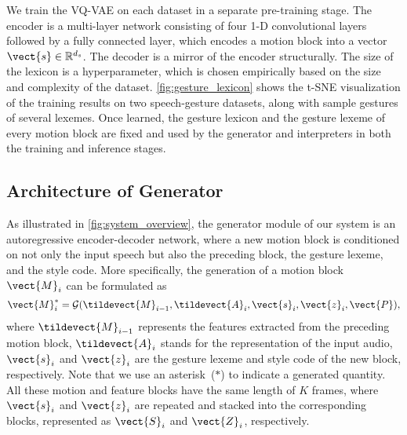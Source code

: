 We train the VQ-VAE on each dataset in a separate pre-training stage. The encoder is a multi-layer network consisting of four 1-D convolutional layers followed by a fully connected layer, which encodes a motion block into a vector $\vect{s}\in\mathbb{R}^{d_s}$. The decoder is a mirror of the encoder structurally. The size of the lexicon is a hyperparameter, which is chosen empirically based on the size and complexity of the dataset. \fig\ref{fig:gesture_lexicon} shows the t-SNE visualization of the training results on two speech-gesture datasets, along with sample gestures of several lexemes. Once learned, the gesture lexicon and the gesture lexeme of every motion block are fixed and used by the generator and interpreters in both the training and inference stages.

\subsection{Architecture of Generator}
As illustrated in \fig\ref{fig:system_overview}, the generator module of our system is an autoregressive encoder-decoder network, where a new motion block is conditioned on not only the input speech but also the preceding block, the gesture lexeme, and the style code. More specifically, the generation of a motion block $\vect{M}_{i}$ can be formulated as
\begin{equation}
    \vect{M}_{i}^*=\mathcal{G}(\tildevect{M}_{i-1},\tildevect{A}_{i},\vect{s}_i,\vect{z}_i,\vect{P}) \label{eqn:generator_block},
\end{equation}
where $\tildevect{M}_{i-1}$ represents the features extracted from the preceding motion block, $\tildevect{A}_{i}$ stands for the representation of the input audio, $\vect{s}_i$ and $\vect{z}_i$ are the gesture lexeme and style code of the new block, respectively. Note that we use an asterisk~($*$) to indicate a generated quantity. All these motion and feature blocks have the same length of $K$ frames, where $\vect{s}_i$ and $\vect{z}_i$ are repeated and stacked into the corresponding blocks, represented as $\vect{S}_i$ and $\vect{Z}_i$, respectively.

